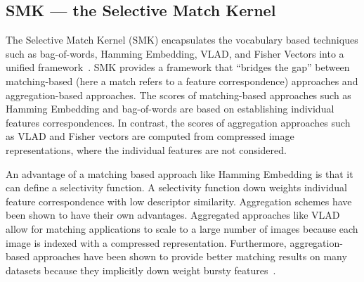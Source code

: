     \subsection{SMK --- the Selective Match Kernel}\label{sec:smk}
        The Selective Match Kernel (SMK) encapsulates the vocabulary based techniques such as bag-of-words, Hamming
        Embedding, VLAD, and Fisher Vectors into a unified framework~\cite{bo_efficient_2009,
        tolias_aggregate_2013, tolias_image_2015, jegou_triangulation_2014}. SMK provides a framework that
        ``bridges the gap'' between matching-based (here a match refers to a feature correspondence) approaches and
        aggregation-based approaches. The scores of matching-based approaches such as Hamming Embedding and
        bag-of-words are based on establishing individual features correspondences. In contrast, the scores of
        aggregation approaches such as VLAD and Fisher vectors are computed from compressed image representations,
        where the individual features are not considered.

        An advantage of a matching based approach like Hamming Embedding is that it can define a selectivity
        function. A selectivity function down weights individual feature correspondence with low descriptor
        similarity. Aggregation schemes have been shown to have their own advantages. Aggregated approaches like
        VLAD allow for matching applications to scale to a large number of images because each image is indexed
        with a compressed representation. Furthermore, aggregation-based approaches have been shown to provide
        better matching results on many datasets because they implicitly down weight bursty
        features~\cite{tolias_aggregate_2013, tolias_image_2015}.



